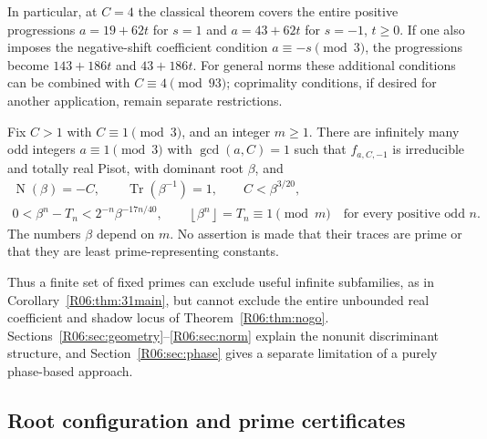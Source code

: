 \documentclass[11pt,a4paper]{article}
\theoremstyle{definition}\newtheorem{definition}[theorem]{Definition}
\theoremstyle{remark}\newtheorem{remark}[theorem]{Remark}
\newcommand{\floor}[1]{\left\lfloor#1\right\rfloor}
\DeclareMathOperator{\Tr}{Tr}\DeclareMathOperator{\tr}{tr}\DeclareMathOperator{\Nm}{N}
\begin{document}
In particular, at $C=4$ the classical theorem covers the entire
positive progressions $a=19+62t$ for $s=1$ and $a=43+62t$ for $s=-1$,
$t\ge0$. If one also imposes the negative-shift coefficient condition
$a\equiv-s\pmod3$, the progressions become $143+186t$ and $43+186t$.
For general norms these additional conditions can be combined with
$C\equiv4\pmod{93}$; coprimality conditions, if desired for another
application, remain separate restrictions.

\begin{mainthm}
\label{R06:thm:nogo}
Fix $C>1$ with $C\equiv1\pmod3$, and an integer $m\ge1$.
There are infinitely many odd integers $a\equiv1\pmod3$ with
$\gcd(a,C)=1$ such that $f_{a,C,-1}$ is irreducible and totally real
Pisot, with dominant root $\beta$, and
\begin{gather*}
 \Nm(\beta)=-C,\qquad \Tr(\beta^{-1})=1,
 \qquad C<\beta^{3/20},\\
 0<\beta^n-T_n<2^{-n}\beta^{-17n/40},\qquad
 \floor{\beta^n}=T_n\equiv1\pmod m
 \quad\text{for every positive odd }n.
\end{gather*}
The numbers $\beta$ depend on $m$. No assertion is made that their
traces are prime or that they are least prime-representing constants.
\end{mainthm}

Thus a finite set of fixed primes can exclude useful infinite
subfamilies, as in Corollary~\ref{R06:thm:31main}, but cannot exclude the
entire unbounded real coefficient and shadow locus of
Theorem~\ref{R06:thm:nogo}. Sections~\ref{R06:sec:geometry}--\ref{R06:sec:norm}
explain the nonunit discriminant structure, and
Section~\ref{R06:sec:phase} gives a separate limitation of a purely
phase-based approach.

\subsection{Root configuration and prime certificates}
\label{R06:sec:families}
\end{document}
